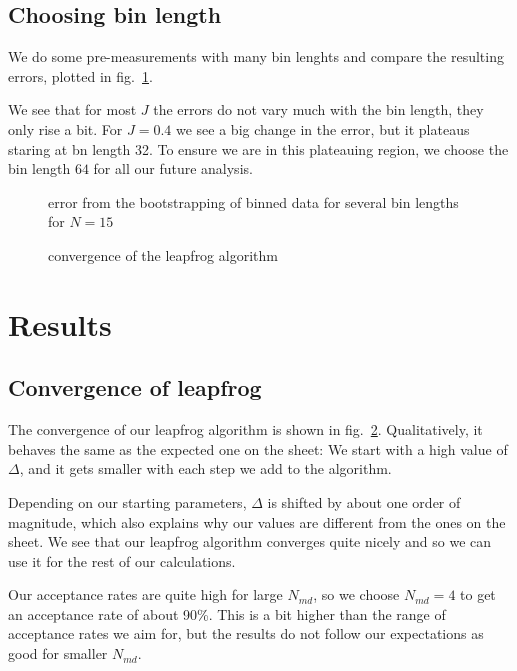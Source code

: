 \documentclass{scrartcl}
\begin{document}
\subsection{Choosing bin length}

We do some pre-measurements with many bin lenghts and compare the resulting errors, plotted in fig.~\ref{fig:bootstrap}.

We see that for most $J$ the errors do not vary much with the bin length, they only rise a bit. For $J=0.4$ we see a big change in the error, but it plateaus staring at bn length 32. To ensure we are in this plateauing region, we choose the bin length $64$ for all our future analysis.

\begin{figure}[htbp]
	
	\caption[error for different bin lengths]{error from the bootstrapping of binned data for several bin lengths for $N=15$}
	\label{fig:bootstrap}
\end{figure}

\begin{figure}[htbp]
	
	\caption{convergence of the leapfrog algorithm}
	\label{fig:converge}
\end{figure}

\section{Results}

\subsection{Convergence of leapfrog}

The convergence of our leapfrog algorithm is shown in fig.~\ref{fig:converge}. Qualitatively, it behaves the same as the expected one on the sheet: We start with a high value of $\Delta$, and it gets smaller with each step we add to the algorithm. 

Depending on our starting parameters, $\Delta$ is shifted by about one order of magnitude, which also explains why our values are different from the ones on the sheet.
We see that our leapfrog algorithm converges quite nicely and so we can use it for the rest of our calculations.


Our acceptance rates are quite high for large $N_{md}$, so we choose $N_{md}=4$ to get an acceptance rate of about 90\%. This is a bit higher than the range of acceptance rates we aim for, but the results do not follow our expectations as good for smaller $N_{md}$.
\end{document}
